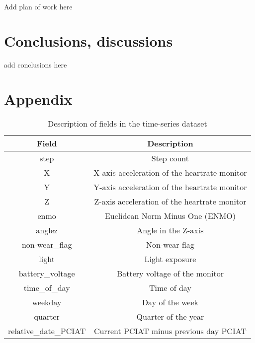 \documentclass[11pt]{extarticle}
\begin{document}
\begin{mdframed}
    Add plan of work here
\end{mdframed}

\section{Conclusions, discussions}

\begin{mdframed}
    add conclusions here
\end{mdframed}




\section{Appendix}

\begin{table}[h!]
    \centering
    \begin{tabular}{|c|c|}
    \hline
    \textbf{Field} & \textbf{Description} \\
    \hline
    step & Step count \\
    X & X-axis acceleration of the heartrate monitor \\
    Y & Y-axis acceleration of the heartrate monitor \\
    Z & Z-axis acceleration of the heartrate monitor \\
    enmo & Euclidean Norm Minus One (ENMO) \\
    anglez & Angle in the Z-axis \\
    non-wear\_flag & Non-wear flag \\
    light & Light exposure \\
    battery\_voltage & Battery voltage of the monitor \\
    time\_of\_day & Time of day \\
    weekday & Day of the week \\
    quarter & Quarter of the year \\
    relative\_date\_PCIAT & Current PCIAT minus previous day PCIAT \\
    \hline
    \end{tabular}
    \caption{Description of fields in the time-series dataset}
    \label{table:fields}
    \end{table}
\end{document}
